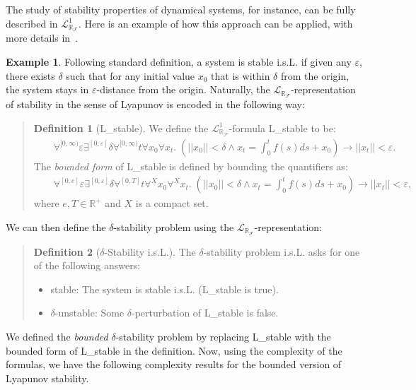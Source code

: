 \documentclass[10pt]{article}
\newcommand{\lrf}{\mathcal{L}_{\mathbb{R}_{\mathcal{F}}}}
\theoremstyle{definition}
\newtheorem{definition}{Definition}[section]
\newtheorem{example}{Example}[section]
\begin{document}
The study of stability properties of dynamical systems, for instance, can be fully described in $\lrf^1$. Here is an example of how this approach can be applied, with more details in~\cite{}. 
\begin{example}
Following standard definition, a system is stable i.s.L. if given any $\varepsilon$, there exists $\delta$ such that for any initial value $x_0$ that is within $\delta$ from the origin, the system stays in $\varepsilon$-distance from the origin. Naturally, the $\lrf$-representation of stability in the sense of Lyapunov is encoded in the following way:
\begin{quote}
\vspace{-.5cm}
\begin{definition}[{\sf L\_stable}]
We define the $\lrf^1$-formula {\sf L\_stable} to be:
\begin{eqnarray*}
& &\forall^{[0,\infty)} \varepsilon\exists^{[0,\varepsilon]} \delta \forall^{[0,\infty)} t\forall x_0\forall x_t .\; (||x_0||<\delta \wedge x_t = \int_0^t f(s)ds + x_0 )\rightarrow ||x_t||<\varepsilon.
\end{eqnarray*}
The {\em bounded form} of {\sf L\_stable} is defined by bounding the quantifiers as:\begin{eqnarray*}
& &\forall^{[0, e]} \varepsilon\exists^{[0,\varepsilon]} \delta \forall^{[0,T]} t\forall^X x_0\forall^X x_t. \;(||x_0||<\delta \wedge x_t = \int_0^t f(s)ds + x_0 )\rightarrow ||x_t||<\varepsilon, 
\end{eqnarray*}
where $e, T\in \mathbb{R}^+$ and $X$ is a compact set.
\end{definition}
\end{quote}
We can then define the $\delta$-stability problem using the $\lrf$-representation:  
\begin{quote}
\vspace{-.5cm}
\begin{definition}[$\delta$-Stability i.s.L.]\label{sl}
The $\delta$-stability problem i.s.L. asks for one of the following answers:
\begin{itemize}
\item {\sf stable}: The system is stable i.s.L. ({\sf L\_stable} is true). 
\item {\sf $\delta$-unstable}: Some $\delta$-perturbation of {\sf L\_stable} is false. 
\end{itemize}
\end{definition}
\end{quote}
We defined the {\em bounded} $\delta$-stability problem by replacing {\sf L\_stable} with the bounded form of {\sf L\_stable} in the definition. Now, using the complexity of the formulas, we have the following complexity results for the bounded version of Lyapunov stability. 

\end{example}
\end{document}
